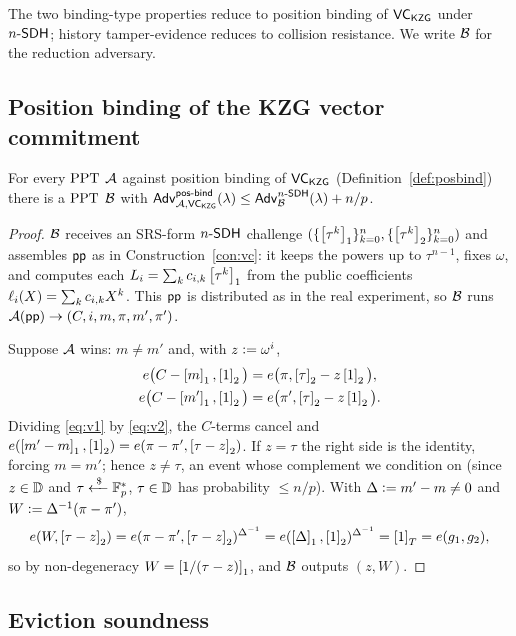 The two binding-type properties reduce to position binding of
$\mathsf{VC}_{\mathsf{KZG}}$ under $n\text{-}\mathsf{SDH}$; history tamper-evidence reduces to collision
resistance. We write $\mathcal{B}$ for the reduction adversary.

\subsection{Position binding of the KZG vector commitment}

\begin{lemma}\label{lem:posbind}
For every $\mathrm{PPT}$ $\mathcal{A}$ against position binding of $\mathsf{VC}_{\mathsf{KZG}}$
(Definition~\ref{def:posbind}) there is a $\mathrm{PPT}$ $\mathcal{B}$ with
$\mathsf{Adv}^{\mathsf{pos\text{-}bind}}_{\mathcal{A},\mathsf{VC}_{\mathsf{KZG}}}(\lambda)\le\mathsf{Adv}^{n\text{-}\mathsf{SDH}}_{\mathcal{B}}(\lambda)+n/p$.
\end{lemma}
\begin{proof}
$\mathcal{B}$ receives an SRS-form $n\text{-}\mathsf{SDH}$ challenge
$(\{\left[\tau^{k}\right]_{1}\}_{k=0}^{n},\{\left[\tau^{k}\right]_{2}\}_{k=0}^{n})$ and assembles
$\mathsf{pp}$ as in Construction~\ref{con:vc}: it keeps the powers up to $\tau^{n-1}$,
fixes $\omega$, and computes each $L_i=\sum_k c_{i,k}\left[\tau^{k}\right]_{1}$ from the
public coefficients $\ell_i(X)=\sum_k c_{i,k}X^{k}$. This $\mathsf{pp}$ is distributed as
in the real experiment, so $\mathcal{B}$ runs $\mathcal{A}(\mathsf{pp})\to(C,i,m,\pi,m',\pi')$.

Suppose $\mathcal{A}$ wins: $m\neq m'$ and, with $z\vcentcolon=\omega^{i}$,
\begin{align}
  e\big(C-\left[m\right]_{1},\left[1\right]_{2}\big)  &= e\big(\pi,\left[\tau\right]_{2}-z\left[1\right]_{2}\big),
    \label{eq:v1}\\
  e\big(C-\left[m'\right]_{1},\left[1\right]_{2}\big) &= e\big(\pi',\left[\tau\right]_{2}-z\left[1\right]_{2}\big).
    \label{eq:v2}
\end{align}
Dividing \eqref{eq:v1} by \eqref{eq:v2}, the $C$-terms cancel and
$e(\left[m'-m\right]_{1},\left[1\right]_{2})=e(\pi-\pi',\left[\tau-z\right]_{2})$. If $z=\tau$ the right side is
the identity, forcing $m=m'$; hence $z\neq\tau$, an event whose complement we
condition on (since $z\in\mathbb{D}$ and $\tau\xleftarrow{\;\$\;}\mathbb{F}_p^{*}$, $\tau\in\mathbb{D}$ has
probability $\le n/p$). With $\Delta\vcentcolon= m'-m\neq0$ and
$W\vcentcolon=\Delta^{-1}(\pi-\pi')$,
\[
  e(W,\left[\tau-z\right]_{2})=e(\pi-\pi',\left[\tau-z\right]_{2})^{\Delta^{-1}}
   =e(\left[\Delta\right]_{1},\left[1\right]_{2})^{\Delta^{-1}}=\left[1\right]_{T}=e(g_1,g_2),
\]
so by non-degeneracy $W=\left[1/(\tau-z)\right]_{1}$, and $\mathcal{B}$ outputs $(z,W)$.
\end{proof}

\subsection{Eviction soundness}

